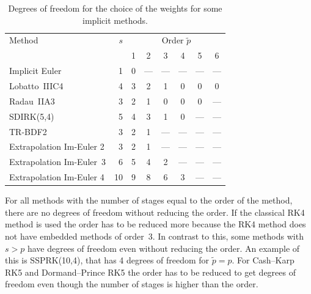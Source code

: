 \documentclass[a4paper]{article}
\numberwithin{equation}{section}
\theoremstyle{plain}
\theoremstyle{definition}
\numberwithin{theorem}{section}
\newcommand{\1}{\mathbbm{1}}
\newcommand{\pt}{{\tilde{p}}}
\begin{document}
\begin{table}[h!]
\centering   %
   \begin{tabular*}{\linewidth}{@{\extracolsep{\fill}}lr*6c@{}}
    \toprule
    Method & $s$ & \multicolumn{6}{c}{Order $\tilde p$} \\
    & & 1 & 2 & 3 & 4 & 5 & 6 \\
    \midrule
    Implicit Euler& 1&0& --- & --- & --- & --- & ---  \\
    Lobatto~IIIC4 \cite{chipman1971stable} & 4&3&2&1&0&0&0 \\
    Radau~IIA3 \cite{ehle1969pade} & 3&2&1&0&0&0& ---  \\
    SDIRK(5,4) \cite[eq. (6.18)]{hairer_solving_1996}& 5&4&3&1&0& --- & ---  \\
    TR-BDF2 \cite{bank1985transient} & 3&2&1& --- & --- & --- & ---  \\
    Extrapolation Im-Euler 2& 3&2&1& --- & --- & --- & ---  \\
    Extrapolation Im-Euler~3& 6&5&4&2& --- & --- & ---  \\
    Extrapolation Im-Euler 4& 10&9&8&6&3& --- & ---  \\
    \bottomrule
  \end{tabular*}
  \caption{Degrees of freedom for the choice of the weights for some implicit methods.} %
  \label{table:DOF_imp}
\end{table}


For all methods with the number of stages equal to the order of the method, there are no degrees of freedom without reducing the order.  
If the classical RK4 method is used the order has to be reduced more because the RK4 method does not have embedded methods of order~3.
In contrast to this, some methods with $s > p$ have degrees of freedom even without reducing the order.
An example of this is SSPRK(10,4), that has 4 degrees of freedom for $\pt = p$.
For Cash--Karp RK5 and Dormand--Prince RK5 the order has to be reduced to get degrees of freedom even though the number of stages is higher than the order.
\end{document}
